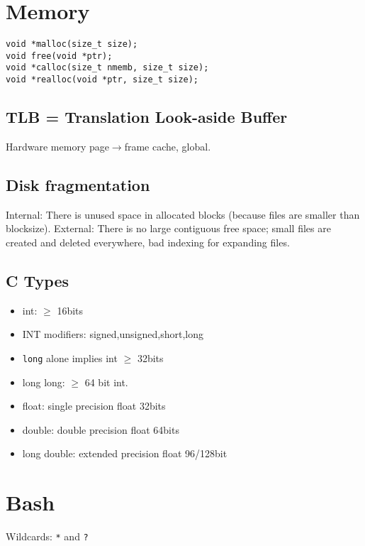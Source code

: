 \documentclass[10pt, a4paper, leqno]{article}
\providecommand{\tightlist}{%
  \setlength{\itemsep}{0pt}\setlength{\parskip}{0pt}}
\begin{document}
\begin{multicols}{2}
\section {Memory}

\begin{verbatim}
void *malloc(size_t size);
void free(void *ptr);
void *calloc(size_t nmemb, size_t size);
void *realloc(void *ptr, size_t size);
\end{verbatim}

\subsection {TLB = Translation Look-aside Buffer}

Hardware memory page$\to$frame cache, global.

\subsection {Disk fragmentation}
Internal: There is unused space in allocated blocks (because files are smaller than blocksize).
External: There is no large contiguous free space; small files are created and deleted everywhere, 
bad indexing for expanding files. 

\subsection {C Types}

\begin{itemize}
    \tightlist
\item int: $\geq$ 16bits
\item INT modifiers: signed,unsigned,short,long 
\item \texttt{long} alone implies int $\geq$ 32bits
\item long long: $\geq$ 64 bit int. 
\item float: single precision float 32bits
\item double: double precision float 64bits
\item long double: extended precision float 96/128bit
\end{itemize}


\section {Bash}

Wildcards: \texttt{*} and \texttt{?}


\end{multicols}
\end{document}
